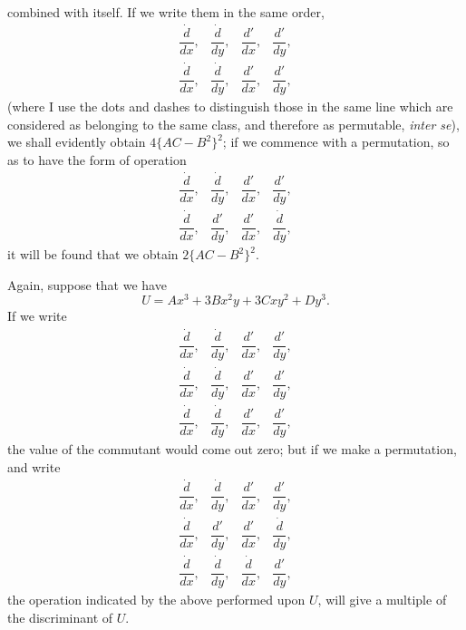 \documentclass[11pt]{article}
\newcommand{\sourcepage}[1]{\marginpar{\scriptsize p.~#1}}
\begin{document}
\sourcepage{320}
combined with itself. If we write them in the same order,
\[
\begin{array}{cccc}
\dfrac{\dot d}{dx},&\dfrac{\dot d}{dy},&\dfrac{d'}{dx},&\dfrac{d'}{dy},\\[0.6em]
\dfrac{\dot d}{dx},&\dfrac{\dot d}{dy},&\dfrac{d'}{dx},&\dfrac{d'}{dy},
\end{array}
\]
(where I use the dots and dashes to distinguish those in the same line which are considered as belonging to the same class, and therefore as permutable, \emph{inter se}), we shall evidently obtain $4\{AC-B^2\}^2$; if we commence with a permutation, so as to have the form of operation
\[
\begin{array}{cccc}
\dfrac{\dot d}{dx},&\dfrac{\dot d}{dy},&\dfrac{d'}{dx},&\dfrac{d'}{dy},\\[0.6em]
\dfrac{\dot d}{dx},&\dfrac{d'}{dy},&\dfrac{d'}{dx},&\dfrac{\dot d}{dy},
\end{array}
\]
it will be found that we obtain $2\{AC-B^2\}^2$.

Again, suppose that we have
\[
U=Ax^3+3Bx^2y+3Cxy^2+Dy^3.
\]
If we write
\[
\begin{array}{cccc}
\dfrac{\dot d}{dx},&\dfrac{\dot d}{dy},&\dfrac{d'}{dx},&\dfrac{d'}{dy},\\[0.6em]
\dfrac{\dot d}{dx},&\dfrac{\dot d}{dy},&\dfrac{d'}{dx},&\dfrac{d'}{dy},\\[0.6em]
\dfrac{\dot d}{dx},&\dfrac{\dot d}{dy},&\dfrac{d'}{dx},&\dfrac{d'}{dy},
\end{array}
\]
the value of the commutant would come out zero; but if we make a permutation, and write
\[
\begin{array}{cccc}
\dfrac{\dot d}{dx},&\dfrac{\dot d}{dy},&\dfrac{d'}{dx},&\dfrac{d'}{dy},\\[0.6em]
\dfrac{\dot d}{dx},&\dfrac{d'}{dy},&\dfrac{d'}{dx},&\dfrac{\dot d}{dy},\\[0.6em]
\dfrac{\dot d}{dx},&\dfrac{\dot d}{dy},&\dfrac{\dot d}{dx},&\dfrac{d'}{dy},
\end{array}
\]
the operation indicated by the above performed upon $U$, will give a multiple of the discriminant of $U$.
\end{document}
